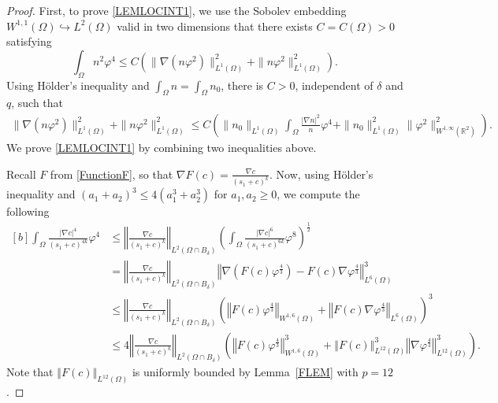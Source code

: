 \documentclass[10pt,a4paper]{amsart}
\newcommand{\R}{{ \mathbb{R}  }}
\newcommand{\bke}[1]{\left( #1 \right)}
\newcommand{\norm}[1]{\left\Vert #1 \right\Vert}
\begin{document}
\begin{proof}
First, to prove \eqref{LEMLOCINT1}, we use the Sobolev embedding $W^{1, 1}(\Omega)\hookrightarrow L^{2}(\Omega)$ valid in two dimensions that there exists $C=C(\Omega)>0$ satisfying
\[
 \int_{\Omega}n^{2}\varphi^{4}   \le C\bke{ \|\nabla(n\varphi^{2})\|_{L^{1}(\Omega)}^{2}+\|n\varphi^{2}\|_{L^{1}(\Omega)}^{2}}.
\]
Using   H\"older's inequality and  $\int_{\Omega}n=\int_{\Omega}n_{0}$, there is $C>0$, independent of $\delta$ and $q$, such that 
\[
\begin{aligned}
 \|\nabla(n\varphi^{2})\|_{L^{1}(\Omega)}^{2} +\|n\varphi^{2}\|_{L^{1}(\Omega)}^{2}
\le C\bke{ \|n_{0}\|_{L^{1}(\Omega)}  \int_{\Omega} \frac{|\nabla n|^{2}}{n}\varphi^{4} +\|n_{0}\|_{L^{1}(\Omega)}^{2}\| \varphi^{2}  \|_{W^{1,\infty}(\R^{2})}^{2} }.
 \end{aligned}
\]
We prove \eqref{LEMLOCINT1} by combining two inequalities above.

Recall $F$ from \eqref{FunctionF}, so that $\nabla F(c)=\frac{\nabla c}{(s_1+c)^k}$.
Now, using  H\"older's  inequality and $(a_{1}+a_{2})^{3}\le 4(a_{1}^{3}+a_{2}^{3})$ for $a_{1},a_{2}\ge0$,  we compute the following 
\begin{equation}\label{LEM5_1}
\begin{aligned}[b]
 \int_{\Omega}\frac{|\nabla c|^{4}}{(s_{1}+c)^{4k}}\varphi^{4}
&\le   \norm{\frac{\nabla c}{(s_{1}+c)^{k}}}_{L^{2}(\Omega\cap B_{\delta})}\bke{\int_{\Omega}\frac{|\nabla c|^{6}}{(s_{1}+c)^{6k}}\varphi^{8}}^{\frac{1}{2}}\\
 &= \norm{\frac{\nabla c}{(s_{1}+c)^{k}}}_{L^{2}(\Omega\cap B_{\delta})}\norm{ \nabla (F(c)\varphi^{\frac{4}{3}})- F(c) \nabla \varphi^{\frac{4}{3}} }_{L^{6}(\Omega)}^{3}
\\
 &\le   \norm{\frac{\nabla c}{(s_{1}+c)^{k}}}_{L^{2}(\Omega\cap B_{\delta})}\bke{\norm{  F(c)  \varphi^{\frac{4}{3}}}_{W^{1,6}(\Omega)} + \norm{F(c)\nabla \varphi^{\frac{4}{3}}}_{L^{6}(\Omega)}}^{3}
\\
& \le  4\norm{\frac{\nabla c}{(s_{1}+c)^{k}}}_{L^{2}(\Omega\cap B_{\delta})} \bke{\norm{  F(c)  \varphi^{\frac{4}{3}}}_{W^{1,6}(\Omega)}^{3}+  \norm{ F(c)}_{L^{12}(\Omega)}^{3}\norm{ \nabla \varphi^{\frac{4}{3}}}_{L^{12}(\Omega)}^{3}}.
\end{aligned}
\end{equation}
Note that $\norm{ F(c)}_{L^{12}(\Omega)}$ is uniformly bounded by Lemma~\ref{FLEM} with $p=12$.


\end{proof}
\end{document}
